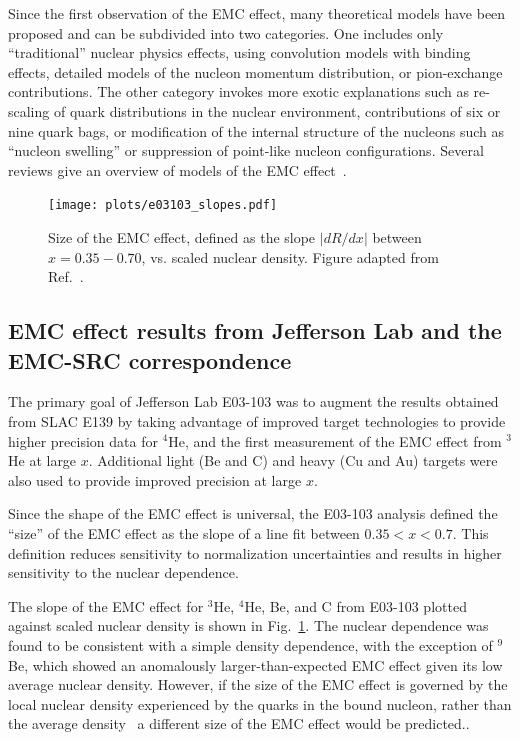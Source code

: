 Since the first observation of the EMC effect, many theoretical models have been proposed and can be subdivided into two categories.  One includes only ``traditional'' nuclear physics effects, using convolution models with binding effects, detailed models of the nucleon momentum distribution, or pion-exchange contributions. The other category invokes more exotic explanations such as re-scaling of quark distributions in the nuclear environment, contributions of six or nine
quark bags, or modification of the internal structure of the nucleons such as ``nucleon swelling'' or suppression of point-like nucleon configurations. Several reviews give an overview of models of the EMC effect~\cite{Geesaman:1995yd, Norton:2003cb, Piller:1999wx, Hen:2013oha, Malace:2014uea}.


\begin{figure}[tbp]
  \centering\texttt{[image: plots/e03103\_slopes.pdf]}
  \caption{Size of the EMC effect, defined as the slope $|dR/dx|$ between $x=0.35-0.70$, vs. scaled nuclear
    density. Figure adapted from Ref.~\cite{Seely:2009gt}.}
  \label{fig:emc_jlab_hallc}
\end{figure}

\subsection{EMC effect results from Jefferson Lab and the EMC-SRC correspondence}

The primary goal of Jefferson Lab E03-103 was to augment the results obtained from SLAC E139 by taking
advantage of improved target technologies to provide higher precision data for $^4$He, and the first
measurement of the EMC effect from $^3$He at large $x$.  Additional light (Be and C) and heavy (Cu and Au)
targets were also used to provide improved precision at large $x$.

Since the shape of the EMC effect is universal, the E03-103 analysis defined the ``size'' of the EMC
effect as the slope of a line fit between $0.35<x<0.7$.  This definition reduces sensitivity to
normalization uncertainties and results in higher sensitivity to the nuclear dependence.

The slope of the EMC effect for $^3$He, $^4$He, Be, and C from E03-103 plotted against scaled nuclear
density is shown in Fig.~\ref{fig:emc_jlab_hallc}.  The nuclear dependence was found to be consistent
with a simple density dependence, with the exception of $^9$Be,  which showed an anomalously larger-than-expected 
EMC effect given its low average nuclear density.  However, if the size of the EMC effect is
governed by the local nuclear density experienced by the quarks in the bound nucleon, rather than the
average density~\cite{Seely:2009gt, PhysRevC.82.054614} a different size of the EMC effect would be predicted..

